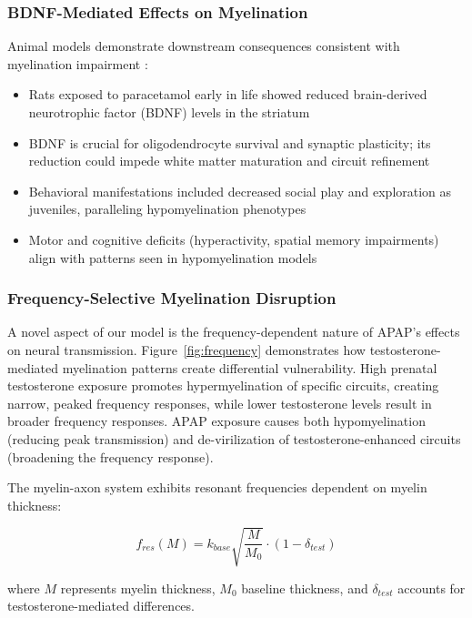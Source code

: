\documentclass[11pt]{article}
\let\oldsubsubsection\subsubsection
\renewcommand{\subsubsection}[1]{\oldsubsubsection{#1}\setlength{\leftskip}{1.5em}}
\begin{document}
\subsubsection{BDNF-Mediated Effects on Myelination}

Animal models demonstrate downstream consequences consistent with myelination impairment \citep{blecharz2018}:

\begin{itemize}
\item Rats exposed to paracetamol early in life showed reduced brain-derived neurotrophic factor (BDNF) levels in the striatum
\item BDNF is crucial for oligodendrocyte survival and synaptic plasticity; its reduction could impede white matter maturation and circuit refinement
\item Behavioral manifestations included decreased social play and exploration as juveniles, paralleling hypomyelination phenotypes
\item Motor and cognitive deficits (hyperactivity, spatial memory impairments) align with patterns seen in hypomyelination models
\end{itemize}

\subsubsection{Frequency-Selective Myelination Disruption}
A novel aspect of our model is the frequency-dependent nature of APAP's effects on neural transmission. Figure~\ref{fig:frequency} demonstrates how testosterone-mediated myelination patterns create differential vulnerability. High prenatal testosterone exposure promotes hypermyelination of specific circuits, creating narrow, peaked frequency responses, while lower testosterone levels result in broader frequency responses. APAP exposure causes both hypomyelination (reducing peak transmission) and de-virilization of testosterone-enhanced circuits (broadening the frequency response).

The myelin-axon system exhibits resonant frequencies dependent on myelin thickness:

\begin{equation}
f_{res}(M) = k_{base} \sqrt{\frac{M}{M_0}} \cdot \left(1 - \delta_{test}\right)
\end{equation}

where $M$ represents myelin thickness, $M_0$ baseline thickness, and $\delta_{test}$ accounts for testosterone-mediated differences.
\end{document}
